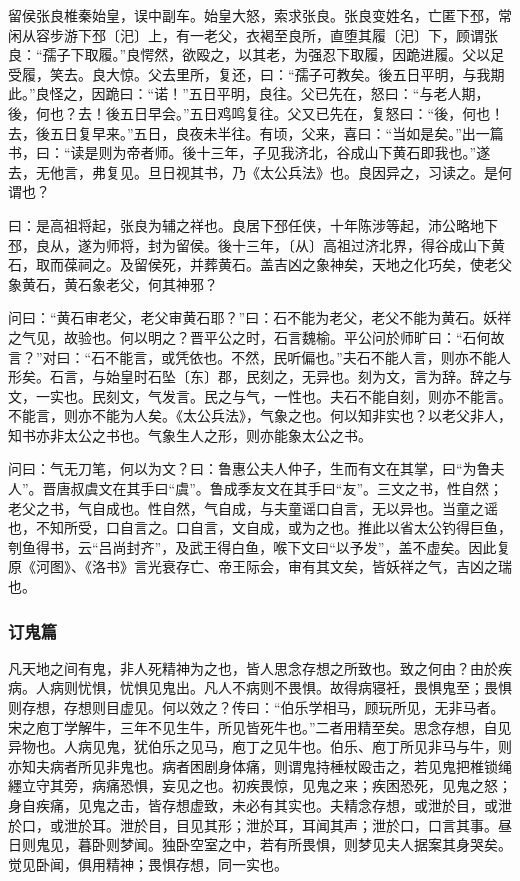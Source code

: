 \documentclass[]{article}
\begin{document}
留侯张良椎秦始皇，误中副车。始皇大怒，索求张良。张良变姓名，亡匿下邳，常闲从容步游下邳〔汜〕上，有一老父，衣褐至良所，直堕其履〔汜〕下，顾谓张良：``孺子下取履。''良愕然，欲殴之，以其老，为强忍下取履，因跪进履。父以足受履，笑去。良大惊。父去里所，复还，曰：``孺子可教矣。後五日平明，与我期此。''良怪之，因跪曰：``诺！''五日平明，良往。父已先在，怒曰：``与老人期，後，何也？去！後五日早会。''五日鸡鸣复往。父又已先在，复怒曰：``後，何也！去，後五日复早来。''五日，良夜未半往。有顷，父来，喜曰：``当如是矣。''出一篇书，曰：``读是则为帝者师。後十三年，子见我济北，谷成山下黄石即我也。''遂去，无他言，弗复见。旦日视其书，乃《太公兵法》也。良因异之，习读之。是何谓也？

曰：是高祖将起，张良为辅之祥也。良居下邳任侠，十年陈涉等起，沛公略地下邳，良从，遂为师将，封为留侯。後十三年，〔从〕高祖过济北界，得谷成山下黄石，取而葆祠之。及留侯死，并葬黄石。盖吉凶之象神矣，天地之化巧矣，使老父象黄石，黄石象老父，何其神邪？

问曰：``黄石审老父，老父审黄石耶？''曰：石不能为老父，老父不能为黄石。妖祥之气见，故验也。何以明之？晋平公之时，石言魏榆。平公问於师旷曰：``石何故言？''对曰：``石不能言，或凭依也。不然，民听偏也。''夫石不能人言，则亦不能人形矣。石言，与始皇时石坠〔东〕郡，民刻之，无异也。刻为文，言为辞。辞之与文，一实也。民刻文，气发言。民之与气，一性也。夫石不能自刻，则亦不能言。不能言，则亦不能为人矣。《太公兵法》，气象之也。何以知非实也？以老父非人，知书亦非太公之书也。气象生人之形，则亦能象太公之书。

问曰：气无刀笔，何以为文？曰：鲁惠公夫人仲子，生而有文在其掌，曰``为鲁夫人''。晋唐叔虞文在其手曰``虞''。鲁成季友文在其手曰``友''。三文之书，性自然；老父之书，气自成也。性自然，气自成，与夫童谣口自言，无以异也。当童之谣也，不知所受，口自言之。口自言，文自成，或为之也。推此以省太公钓得巨鱼，刳鱼得书，云``吕尚封齐''，及武王得白鱼，喉下文曰``以予发''，盖不虚矣。因此复原《河图》、《洛书》言光衰存亡、帝王际会，审有其文矣，皆妖祥之气，吉凶之瑞也。

\hypertarget{header-n814}{%
\subsubsection{订鬼篇}\label{header-n814}}

凡天地之间有鬼，非人死精神为之也，皆人思念存想之所致也。致之何由？由於疾病。人病则忧惧，忧惧见鬼出。凡人不病则不畏惧。故得病寝衽，畏惧鬼至；畏惧则存想，存想则目虚见。何以效之？传曰：``伯乐学相马，顾玩所见，无非马者。宋之庖丁学解牛，三年不见生牛，所见皆死牛也。''二者用精至矣。思念存想，自见异物也。人病见鬼，犹伯乐之见马，庖丁之见牛也。伯乐、庖丁所见非马与牛，则亦知夫病者所见非鬼也。病者困剧身体痛，则谓鬼持棰杖殴击之，若见鬼把椎锁绳纆立守其旁，病痛恐惧，妄见之也。初疾畏惊，见鬼之来；疾困恐死，见鬼之怒；身自疾痛，见鬼之击，皆存想虚致，未必有其实也。夫精念存想，或泄於目，或泄於口，或泄於耳。泄於目，目见其形；泄於耳，耳闻其声；泄於口，口言其事。昼日则鬼见，暮卧则梦闻。独卧空室之中，若有所畏惧，则梦见夫人据案其身哭矣。觉见卧闻，俱用精神；畏惧存想，同一实也。
\end{document}
